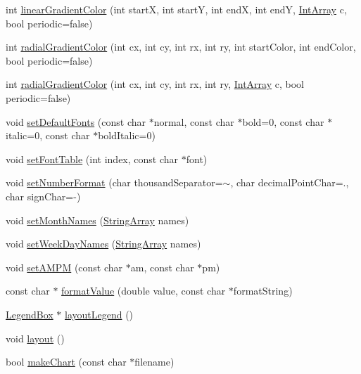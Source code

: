 \begin{DoxyCompactItemize}
\item 
int \hyperlink{class_base_chart_ace8cbeb2885b2141b081f26a85339eff}{linear\+Gradient\+Color} (int startX, int startY, int endX, int endY, \hyperlink{class_int_array}{Int\+Array} c, bool periodic=false)
\item 
int \hyperlink{class_base_chart_ad6996ebdeebe20e9a709726867bc5b77}{radial\+Gradient\+Color} (int cx, int cy, int rx, int ry, int start\+Color, int end\+Color, bool periodic=false)
\item 
int \hyperlink{class_base_chart_aa214991698053b844aac4aa621dd6511}{radial\+Gradient\+Color} (int cx, int cy, int rx, int ry, \hyperlink{class_int_array}{Int\+Array} c, bool periodic=false)
\item 
void \hyperlink{class_base_chart_a972253c28223ba0f9811657fa783a674}{set\+Default\+Fonts} (const char $\ast$normal, const char $\ast$bold=0, const char $\ast$italic=0, const char $\ast$bold\+Italic=0)
\item 
void \hyperlink{class_base_chart_ad0c87a37505dbfcac5a20286053552e5}{set\+Font\+Table} (int index, const char $\ast$font)
\item 
void \hyperlink{class_base_chart_ae9a84d62ae1bf380296976bba8cd98c9}{set\+Number\+Format} (char thousand\+Separator=\textquotesingle{}$\sim$\textquotesingle{}, char decimal\+Point\+Char=\textquotesingle{}.\textquotesingle{}, char sign\+Char=\textquotesingle{}-\/\textquotesingle{})
\item 
void \hyperlink{class_base_chart_ab4eb2087f764057db74611a6fdc1fab7}{set\+Month\+Names} (\hyperlink{class_string_array}{String\+Array} names)
\item 
void \hyperlink{class_base_chart_ae5e356fe9bf0920d82b58e077eb317c5}{set\+Week\+Day\+Names} (\hyperlink{class_string_array}{String\+Array} names)
\item 
void \hyperlink{class_base_chart_a41ba33ec1d9c3dd835653dc63571f2bf}{set\+A\+M\+PM} (const char $\ast$am, const char $\ast$pm)
\item 
const char $\ast$ \hyperlink{class_base_chart_a4d416306451019458d6de5dbc3dd952f}{format\+Value} (double value, const char $\ast$format\+String)
\item 
\hyperlink{class_legend_box}{Legend\+Box} $\ast$ \hyperlink{class_base_chart_a3b89c7ea3cce0558699dea32bcfba330}{layout\+Legend} ()
\item 
void \hyperlink{class_base_chart_a1a44c678189fcf8b7b58bd37dd3dcd3d}{layout} ()
\item 
bool \hyperlink{class_base_chart_aa5c1afc94d6cc856f3d34b886e88748a}{make\+Chart} (const char $\ast$filename)

\end{DoxyCompactItemize}
